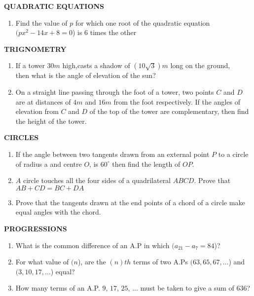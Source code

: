 \documentclass{article}
\begin{document}
\begin{center}
\textbf{QUADRATIC EQUATIONS}
\end{center}
\begin{enumerate}
	\item Find the value of $p$ for which one root of the quadratic equation \\ $( px^2-14x+8=0$) is $6$ times the other
\end{enumerate}
\begin{center}
\textbf{TRIGNOMETRY}
\end{center}
\begin{enumerate}
	\item If a tower $30m$ high,casts a shadow of $(10\sqrt{3})m$ long on the ground, \\ then what is the angle of elevation of the sun?
	\item On a straight line passing through the foot of a tower, two points $C$ and $D$ are at distances of $4m$ and $16m$ from the foot respectively. If the angles of elevation from $C$ and $D$ of the top of the tower are complementary, then find the height of the tower.
\end{enumerate}
\begin{center}
\textbf{CIRCLES}
\end{center}
\begin{enumerate}
	\item If the angle between two tangents drawn from an external point $P$ to a circle of radius a and centre $O$, is $60^\circ $ then find the length of $OP$.
	\item $A$ circle touches all the four sides of a quadrilateral $ABCD$. Prove that\\
$AB + CD = BC + DA$
\item Prove that the tangents drawn at the end points of a chord of a circle make equal angles with the chord.
\end{enumerate}
\begin{center}
\textbf{PROGRESSIONS}
\end{center}
\begin{enumerate}
	\item What is the common difference of an A.P in which $(a_{21} - a_{7} = 84$)?
	\item For what value of $(n$), are the $(n)th$ terms of two A.Ps $(63,65,67, \dots$) and $(3, 10, 17, \dots$) equal?
	\item How many terms of an A.P. $9$, $17$, $25$, ... must be taken to give a sum of $636$?
\end{enumerate}
\end{document}

